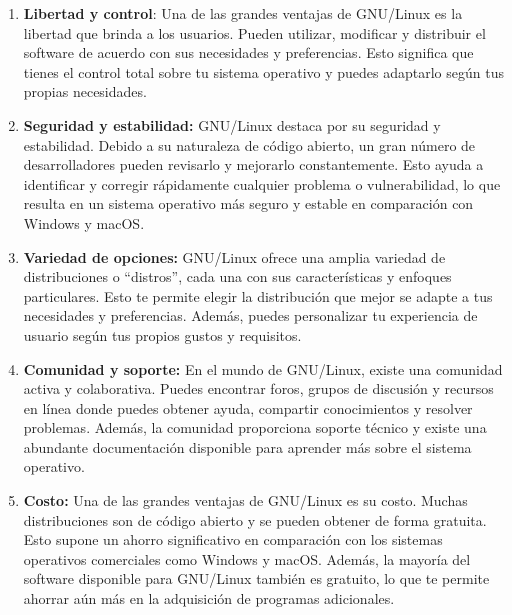 \documentclass[
  a4paper,
]{article}
\begin{document}
\begin{enumerate}
\def\labelenumi{\arabic{enumi}.}
\item
  \textbf{Libertad y control}: Una de las grandes ventajas de GNU/Linux
  es la libertad que brinda a los usuarios. Pueden utilizar, modificar y
  distribuir el software de acuerdo con sus necesidades y preferencias.
  Esto significa que tienes el control total sobre tu sistema operativo
  y puedes adaptarlo según tus propias necesidades.
\item
  \textbf{Seguridad y estabilidad:} GNU/Linux destaca por su seguridad y
  estabilidad. Debido a su naturaleza de código abierto, un gran número
  de desarrolladores pueden revisarlo y mejorarlo constantemente. Esto
  ayuda a identificar y corregir rápidamente cualquier problema o
  vulnerabilidad, lo que resulta en un sistema operativo más seguro y
  estable en comparación con Windows y macOS.
\item
  \textbf{Variedad de opciones:} GNU/Linux ofrece una amplia variedad de
  distribuciones o ``distros'', cada una con sus características y
  enfoques particulares. Esto te permite elegir la distribución que
  mejor se adapte a tus necesidades y preferencias. Además, puedes
  personalizar tu experiencia de usuario según tus propios gustos y
  requisitos.
\item
  \textbf{Comunidad y soporte:} En el mundo de GNU/Linux, existe una
  comunidad activa y colaborativa. Puedes encontrar foros, grupos de
  discusión y recursos en línea donde puedes obtener ayuda, compartir
  conocimientos y resolver problemas. Además, la comunidad proporciona
  soporte técnico y existe una abundante documentación disponible para
  aprender más sobre el sistema operativo.
\item
  \textbf{Costo:} Una de las grandes ventajas de GNU/Linux es su costo.
  Muchas distribuciones son de código abierto y se pueden obtener de
  forma gratuita. Esto supone un ahorro significativo en comparación con
  los sistemas operativos comerciales como Windows y macOS. Además, la
  mayoría del software disponible para GNU/Linux también es gratuito, lo
  que te permite ahorrar aún más en la adquisición de programas
  adicionales.
\end{enumerate}


\printbibliography
\end{document}
